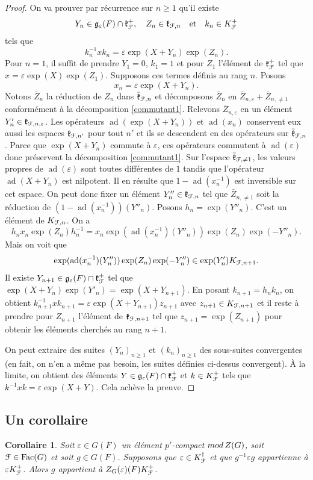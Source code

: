 \documentclass[11pt]{article}
\newcommand{\Subsection}{\subsection}
\numberwithin{equation}{section}\providecommand{\og}{«\,}\providecommand{\fg}{\,»}
\let\mathcal \EuScript
\let\epsilon\varepsilon
\newcommand{\quadet}{\quad\text{et}\quad}
\newcommand{\rmod}{\textup{mod}\,}
\newcommand{\frg}{\mathfrak{g}}
\newcommand{\frk}{\mathfrak{k}}
\newcommand{\Fac}{\mathrm{Fac}}
\DeclareMathOperator{\ad}{ad}
\newcommand{\cF}{\mathcal{F}}
\theoremstyle{plain}
\newtheorem*{cor*}{Corollaire}
\theoremstyle{definition}
\begin{document}
\begin{proof}
On va prouver par récurrence sur $n\geq1$ qu'il existe
\[
Y_{n}\in \frg_{\epsilon}(F)\cap \frk_{\cF}^+,\quad Z_{n}\in \frk_{\cF,n}\quadet k_{n}\in K_{\cF}^+
\]
tels que
\[
k_{n}^{-1}xk_{n}=\epsilon \exp(X+Y_{n})\exp(Z_{n}).
\]
Pour $n=1$, il suffit de prendre $Y_{1}=0$, $k_{1}=1$ et pour $Z_{1}$ l'élément de $\frk_{\cF}^+$ tel que $x=\epsilon \exp(X)\exp(Z_{1})$. Supposons ces termes définis au rang $n$. Posons
\[
x_{n}=\epsilon \exp(X+Y_{n}).
\]
Notons $\bar{Z}_{n}$ la réduction de $Z_{n}$ dans $\bar{\frk}_{\cF,n}$ et décomposons $\bar{Z}_{n}$ en $\bar{Z}_{n,\epsilon}+\bar{Z}_{n,\neq1}$ conformément à la décomposition \eqref{commutant1}. Relevons $\bar{Z}_{n,\epsilon}$ en un élément $Y'_{n}\in \frk_{\cF,n,\epsilon}$. Les opérateurs $\ad(\exp(X+Y_{n}))$ et $\ad(x_{n})$ conservent eux aussi les espaces $\frk_{\cF,n'}$ pour tout $n'$ et ils se descendent en des opérateurs sur $\bar{\frk}_{\cF,n}$. Parce que $\exp(X+Y_{n})$ commute à $\epsilon$, ces opérateurs commutent à $\ad(\epsilon)$ donc préservent la décomposition \eqref{commutant1}. Sur l'espace $\bar{\frk}_{\cF,\neq1}$, les valeurs propres de $\ad(\epsilon)$ sont toutes différentes de $1$ tandis que l'opérateur $\ad(X+Y_{n})$ est nilpotent. Il en résulte que $1-\ad(x_{n}^{-1})$ est inversible sur cet espace. On peut donc fixer un élément $Y''_{n}\in \frk_{\cF,n}$ tel que $\bar{Z}_{n,\neq1}$ soit la réduction de $(1-\ad(x_{n}^{-1}))(Y''_{n})$. Posons $h_{n}=\exp(Y''_{n})$. C'est un élément de $K_{\cF,n}$. On a
\[
h_{n}x_{n}\exp(Z_{n})h_{n}^{-1}=x_{n}\exp(\ad(x_{n}^{-1})(Y''_{n}))\exp(Z_{n})\exp(-Y''_{n}).
\]
Mais on voit que
\[
\exp(\ad(x_{n}^{-1})(Y''_{n}))\exp(Z_{n})\exp(-Y''_{n})\in \exp(Y'_{n})K_{\cF,n+1}.
\]
Il existe $Y_{n+1}\in \frg_{\epsilon}(F)\cap \frk_{\cF}^+ $ tel que $\exp(X+Y_{n})\exp(Y'_{n})=\exp(X+Y_{n+1})$. En posant $k_{n+1}=h_{n}k_{n}$, on obtient
$k_{n+1}^{-1}xk_{n+1}=\epsilon \exp(X+Y_{n+1})z_{n+1}$ avec $z_{n+1}\in K_{\cF,n+1}$ et il reste à prendre pour $Z_{n+1}$ l'élément de $\frk_{\cF,n+1}$ tel que $z_{n+1}=\exp(Z_{n+1})$ pour obtenir les éléments cherchés au rang $n+1$.

On peut extraire des suites $(Y_{n})_{n\geq1}$ et $(k_{n})_{n\geq1}$ des sous-suites convergentes (en fait, on n'en a même pas besoin, les suites définies ci-dessus convergent). À la limite, on obtient des éléments $Y\in \frg_{\epsilon}(F)\cap \frk_{\cF}^+$ et $k\in K_{\cF}^+$ tels que $k^{-1}xk=\epsilon \exp(X+Y)$. Cela achève la preuve.
\end{proof}

\Subsection{Un corollaire}\label{corollaire}
\begin{cor*}
Soit $\epsilon\in G(F)$ un élément $p'$-compact $\rmod Z(G)$, soit $\cF\in \Fac(G)$ et soit $g\in G(F)$. Supposons que $\epsilon\in K_{\cF}^{\dag}$ et que $g^{-1}\epsilon g$ appartienne à $\epsilon K_{\cF}^+$. Alors $g$ appartient à $Z_{G}(\epsilon)(F)K_{\cF}^+$.
\end{cor*}
\end{document}
